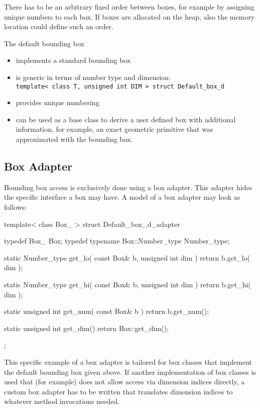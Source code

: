 There has to be an arbitrary fixed order between boxes, for example by
assigning unique numbers to each box. If boxes are allocated on the
heap, also the memory location could define such an order. 

The default bounding box 
\begin{itemize} 
  \item implements a standard bounding box 
  \item is generic in terms of number type and dimension: \\
  \texttt{template< class T, unsigned int DIM > struct Default\_box\_d} 
  \item provides unique numbering
  \item can be used as a base class to derive a user defined box with
  additional information, for example, an exact geometric primitive
  that was approximated with the bounding box.
\end{itemize}

\subsection*{Box Adapter}
Bounding box access is exclusively done using a box adapter. This adapter hides the specific interface a box may have. A model of a box adapter may look as follows:
\begin{ccExampleCode}
template< class Box_ >
struct Default_box_d_adapter {
    typedef Box_ Box;
    typedef typename Box::Number_type Number_type;

    static Number_type get_lo( const Box& b, unsigned int dim )
    { return b.get_lo( dim ); }

    static Number_type get_hi( const Box& b, unsigned int dim )
    { return b.get_hi( dim ); }

    static unsigned int get_num( const Box& b )
    { return b.get_num();     }

    static unsigned int get_dim() 
    { return Box::get_dim(); }
};
\end{ccExampleCode}

This specific example of a box adapter is tailored for box classes that implement the default bounding box given above. If another implementation of box classes is used that (for example) does not allow access via dimension indices directly, a custom box adapter has to be written that translates dimension indices to whatever method invocations needed.


